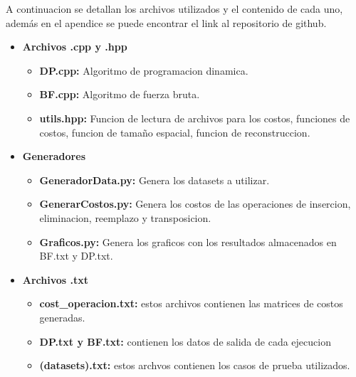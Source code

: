 A continuacion se detallan los archivos utilizados y el contenido de cada uno, además en el apendice se puede encontrar el link al repositorio
de github. 

\begin{itemize}
    \item \textbf{Archivos .cpp y .hpp}
    \begin{itemize}
        \item \textbf{DP.cpp:} Algoritmo de programacion dinamica.
        \item \textbf{BF.cpp:} Algoritmo de fuerza bruta.
        \item \textbf{utils.hpp:} Funcion de lectura de archivos para los costos, funciones de costos, funcion de tamaño espacial, funcion de reconstruccion.
    \end{itemize}
    \item \textbf{Generadores}
    \begin{itemize}
        \item \textbf{GeneradorData.py: } Genera los datasets a utilizar.
        \item \textbf{GenerarCostos.py: } Genera los costos de las operaciones de insercion, eliminacion, reemplazo y transposicion.
        \item \textbf{Graficos.py: } Genera los graficos con los resultados almacenados en BF.txt y DP.txt.
    \end{itemize}
    \item \textbf{Archivos .txt}
    \begin{itemize}
        \item \textbf{cost\_operacion.txt: } estos archivos contienen las matrices de costos generadas. 
        \item \textbf{DP.txt y BF.txt: } contienen los datos de salida de cada ejecucion
        \item \textbf{(datasets).txt: } estos archvos contienen los casos de prueba utilizados.
    \end{itemize}
\end{itemize}